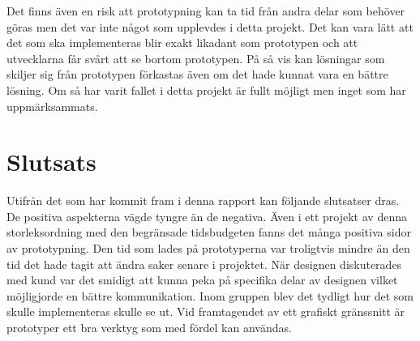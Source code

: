 Det finns även en risk att prototypning kan ta tid från andra delar som behöver göras men det var inte något som upplevdes i detta projekt. Det kan vara lätt att det som ska implementeras blir exakt likadant som prototypen och att utvecklarna får svårt att se bortom prototypen. På så vis kan lösningar som skiljer sig från prototypen förkastas även om det hade kunnat vara en bättre lösning. Om så har varit fallet i detta projekt är fullt möjligt men inget som har uppmärksammats.         

\section{Slutsats}
Utifrån det som har kommit fram i denna rapport kan följande slutsatser dras. De positiva aspekterna vägde tyngre än de negativa. Även i ett projekt av denna storleksordning med den begränsade tidsbudgeten fanns det många positiva sidor av prototypning. Den tid som lades på prototyperna var troligtvis mindre än den tid det hade tagit att ändra saker senare i projektet. När designen diskuterades med kund var det smidigt att kunna peka på specifika delar av designen vilket möjligjorde en bättre kommunikation. Inom gruppen blev det tydligt hur det som skulle implementeras skulle se ut. Vid framtagendet av ett grafiskt gränssnitt är prototyper ett bra verktyg som med fördel kan användas.       

